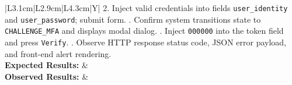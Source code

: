 \documentclass[11pt,a4paper]{article}
\begin{document}
\begin{table}[htbp]
\begin{tabularx}{\textwidth}{|L{3.1cm}|L{2.9cm}|L{4.3cm}|Y|}
{2. Inject valid credentials into fields \texttt{user\_identity} and \texttt{user\_password}; submit form. . Confirm system transitions state to \texttt{CHALLENGE\_MFA} and displays modal dialog. . Inject \texttt{000000} into the token field and press \texttt{Verify}. . Observe HTTP response status code, JSON error payload, and front-end alert rendering.} \\
\hline
\textbf{Expected Results:} &  \\
\hline
\textbf{Observed Results:} &  \\
\hline
\end{tabularx}
\caption{Production-Grade Standardized Test Plan Artifact Specimen.}
\label{tab:test_plan_specimen}
\end{table}
\end{document}
